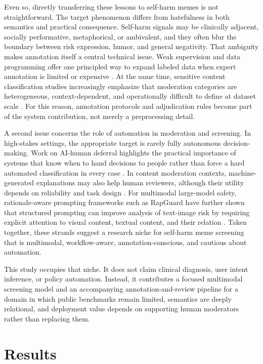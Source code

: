 \documentclass[pdflatex,sn-mathphys-num]{sn-jnl}%
\theoremstyle{thmstyleone}%
\theoremstyle{thmstyletwo}%
\theoremstyle{thmstylethree}%
\begin{document}
Even so, directly transferring these lessons to self-harm memes is not straightforward. The target phenomenon differs from hatefulness in both semantics and practical consequence. Self-harm signals may be clinically adjacent, socially performative, metaphorical, or ambivalent, and they often blur the boundary between risk expression, humor, and general negativity. That ambiguity makes annotation itself a central technical issue. Weak supervision and data programming offer one principled way to expand labeled data when expert annotation is limited or expensive \cite{bib16}. At the same time, sensitive content classification studies increasingly emphasize that moderation categories are heterogeneous, context-dependent, and operationally difficult to define at dataset scale \cite{bib17}. For this reason, annotation protocols and adjudication rules become part of the system contribution, not merely a preprocessing detail.

A second issue concerns the role of automation in moderation and screening. In high-stakes settings, the appropriate target is rarely fully autonomous decision-making. Work on AI-human deferral highlights the practical importance of systems that know when to hand decisions to people rather than force a hard automated classification in every case \cite{bib18}. In content moderation contexts, machine-generated explanations may also help human reviewers, although their utility depends on reliability and task design \cite{bib19}. For multimodal large-model safety, rationale-aware prompting frameworks such as RapGuard have further shown that structured prompting can improve analysis of text-image risk by requiring explicit attention to visual content, textual content, and their relation \cite{bib20}. Taken together, these strands suggest a research niche for self-harm meme screening that is multimodal, workflow-aware, annotation-conscious, and cautious about automation.

This study occupies that niche. It does not claim clinical diagnosis, user intent inference, or policy automation. Instead, it contributes a focused multimodal screening model and an accompanying annotation-and-review pipeline for a domain in which public benchmarks remain limited, semantics are deeply relational, and deployment value depends on supporting human moderators rather than replacing them.

\section{Results}\label{sec2}
\end{document}
